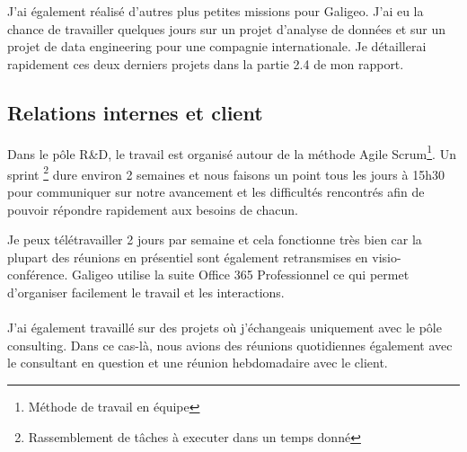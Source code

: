 J’ai également réalisé d’autres plus petites missions pour Galigeo. J’ai eu la chance de travailler quelques jours sur un projet d’analyse de données et sur un projet de data engineering pour une compagnie internationale. Je détaillerai rapidement ces deux derniers projets dans la partie 2.4 de mon rapport.


\subsection{Relations internes et client}

Dans le pôle R\&D, le travail est organisé autour de la méthode Agile Scrum\footnote{Méthode de travail en équipe}. Un sprint \footnote{Rassemblement de tâches à executer dans un temps donné} dure environ 2 semaines et nous faisons un point tous les jours à 15h30 pour communiquer sur notre avancement et les difficultés rencontrés afin de pouvoir répondre rapidement aux besoins de chacun.

Je peux télétravailler 2 jours par semaine et cela fonctionne très bien car la plupart des réunions en présentiel sont également retransmises en visio-conférence. Galigeo utilise la suite Office 365 Professionnel ce qui permet d’organiser facilement le travail et les interactions.

\paragraph*{}

J’ai également travaillé sur des projets où j’échangeais uniquement avec le pôle consulting. Dans ce cas-là, nous avions des réunions quotidiennes également avec le consultant en question et une réunion hebdomadaire avec le client.
